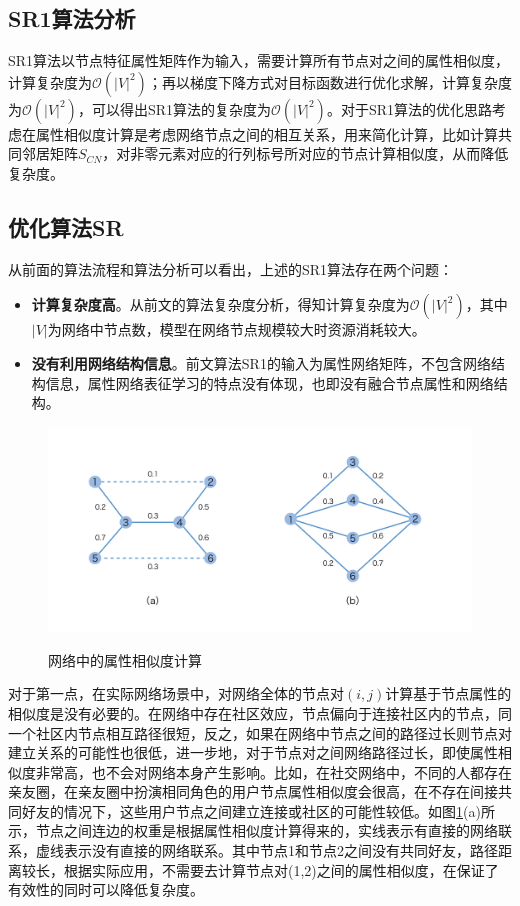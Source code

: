 \subsection{SR1算法分析}
SR1算法以节点特征属性矩阵作为输入，需要计算所有节点对之间的属性相似度，计算复杂度为$\mathcal{O}(|V|^2)$；再以梯度下降方式对目标函数进行优化求解，计算复杂度为$\mathcal{O}(|V|^2)$，可以得出SR1算法的复杂度为$\mathcal{O}(|V|^2)$。对于SR1算法的优化思路考虑在属性相似度计算是考虑网络节点之间的相互关系，用来简化计算，比如计算共同邻居矩阵$S_{CN}$，对非零元素对应的行列标号所对应的节点计算相似度，从而降低复杂度。

\subsection{优化算法SR}
从前面的算法流程和算法分析可以看出，上述的SR1算法存在两个问题：
\begin{itemize}
	\item \textbf{计算复杂度高}。从前文的算法复杂度分析，得知计算复杂度为$\mathcal{O}(|V|^2)$，其中$|V|$为网络中节点数，模型在网络节点规模较大时资源消耗较大。
	\item \textbf{没有利用网络结构信息}。前文算法SR1的输入为属性网络矩阵，不包含网络结构信息，属性网络表征学习的特点没有体现，也即没有融合节点属性和网络结构。
\end{itemize}
\begin{figure}[!ht]
	\begin{center}
		{\includegraphics[width=5in]{figures/similar_opt.png}}
		\caption{网络中的属性相似度计算}
		\label{fig:similar_opt}
	\end{center}
\end{figure}

对于第一点，在实际网络场景中，对网络全体的节点对$(i,j)$计算基于节点属性的相似度是没有必要的。在网络中存在社区效应，节点偏向于连接社区内的节点，同一个社区内节点相互路径很短，反之，如果在网络中节点之间的路径过长则节点对建立关系的可能性也很低，进一步地，对于节点对之间网络路径过长，即使属性相似度非常高，也不会对网络本身产生影响。比如，在社交网络中，不同的人都存在亲友圈，在亲友圈中扮演相同角色的用户节点属性相似度会很高，在不存在间接共同好友的情况下，这些用户节点之间建立连接或社区的可能性较低。如图\ref{fig:similar_opt}(a)所示，节点之间连边的权重是根据属性相似度计算得来的，实线表示有直接的网络联系，虚线表示没有直接的网络联系。其中节点1和节点2之间没有共同好友，路径距离较长，根据实际应用，不需要去计算节点对(1,2)之间的属性相似度，在保证了有效性的同时可以降低复杂度。

